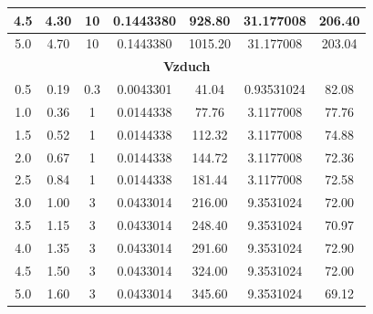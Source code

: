 \documentclass[titlepage]{article}
\begin{document}
\begin{tabular}{|c|c|c|c|c|c|c|}
\hline
4.5                & 4.30            & 10              & 0.1443380  & 928.80      & 31.177008     & 206.40       \\ 
\hline
5.0                & 4.70            & 10              & 0.1443380  & 1015.20     & 31.177008     & 203.04       \\ 
\hline\hline
\multicolumn{7}{|c|}{\textbf{Vzduch}}                                                                            \\ 
\hline\hline
0.5                & 0.19            & 0.3             & 0.0043301  & 41.04       & 0.93531024    & 82.08        \\ 
\hline
1.0                & 0.36            & 1               & 0.0144338  & 77.76       & 3.1177008     & 77.76        \\ 
\hline
1.5                & 0.52            & 1               & 0.0144338  & 112.32      & 3.1177008     & 74.88        \\ 
\hline
2.0                & 0.67            & 1               & 0.0144338  & 144.72      & 3.1177008     & 72.36        \\ 
\hline
2.5                & 0.84            & 1               & 0.0144338  & 181.44      & 3.1177008     & 72.58        \\ 
\hline
3.0                & 1.00            & 3               & 0.0433014  & 216.00      & 9.3531024     & 72.00        \\ 
\hline
3.5                & 1.15            & 3               & 0.0433014  & 248.40      & 9.3531024     & 70.97        \\ 
\hline
4.0                & 1.35            & 3               & 0.0433014  & 291.60      & 9.3531024     & 72.90        \\ 
\hline
4.5                & 1.50            & 3               & 0.0433014  & 324.00      & 9.3531024     & 72.00        \\ 
\hline
5.0                & 1.60            & 3               & 0.0433014  & 345.60      & 9.3531024     & 69.12        \\
\hline
\end{tabular}
    				
\end{document}
